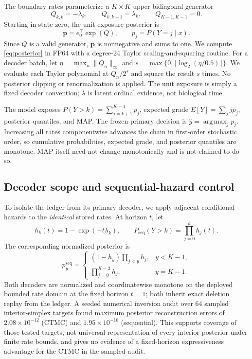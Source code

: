 \documentclass[10pt,twocolumn,letterpaper]{article}
\DeclareMathOperator*{\argmax}{arg\,max}
\begin{document}
The boundary rates parameterize a $K\times K$ upper-bidiagonal generator
\begin{equation}
Q_{k,k}=-\lambda_k,\qquad Q_{k,k+1}=\lambda_k,
\qquad Q_{K-1,K-1}=0.
\label{eq:generator}
\end{equation}
Starting in state zero, the unit-exposure posterior is
\begin{equation}
\mathbf p=e_0^\top\exp(Q),
\qquad p_j=P(Y=j\mid x).
\label{eq:posterior}
\end{equation}
Since $Q$ is a valid generator, $\mathbf p$ is nonnegative and sums to one.
We compute \cref{eq:posterior} in FP64 with a degree-24 Taylor
scaling-and-squaring routine.  For a decoder batch, let
$\eta=\max_n\lVert Q_n\rVert_\infty$ and
$s=\max\{0,\lceil\log_2(\eta/0.5)\rceil\}$.  We evaluate each Taylor
polynomial at $Q_n/2^s$ and square the result $s$ times.  No posterior clipping
or renormalization is applied.
The unit exposure is simply a fixed decoder convention; $\lambda$ is latent
ordinal evidence, not biological time.

The model exposes $P(Y>k)=\sum_{j=k+1}^{K-1}p_j$, expected grade
$E[Y]=\sum_jjp_j$, posterior quantiles, and MAP.  The frozen primary decision
is $\hat y=\argmax_jp_j$.  Increasing all rates componentwise advances the
chain in first-order stochastic order, so cumulative probabilities, expected
grade, and posterior quantiles are monotone.  MAP itself need not change
monotonically and is not claimed to do so.

\subsection{Decoder scope and sequential-hazard control}
\label{sec:decoder-scope}

To isolate the ledger from its primary decoder, we apply adjacent conditional
hazards to the \emph{identical} stored rates.  At horizon $t$, let
\begin{equation}
h_k(t)=1-\exp(-t\lambda_k),\qquad
P_{\mathrm{seq}}(Y>k)=\prod_{j=0}^{k}h_j(t).
\label{eq:sequential-tails}
\end{equation}
The corresponding normalized posterior is
\begin{equation}
p^{\mathrm{seq}}_y=
\begin{cases}
(1-h_y)\prod_{j<y}h_j,&y<K-1,\\
\prod_{j=0}^{K-2}h_j,&y=K-1.
\end{cases}
\label{eq:sequential-posterior}
\end{equation}
Both decoders are normalized and coordinatewise monotone on the deployed
bounded rate domain at the fixed horizon $t=1$; both inherit exact deletion
replay from the ledger.  A seeded numerical inversion audit over 64 sampled
interior-simplex targets found maximum posterior reconstruction errors of
$2.08\times10^{-12}$ (CTMC) and $1.95\times10^{-16}$ (sequential).  This
supports coverage of those tested targets, not universal representation of
every interior posterior under finite rate bounds, and gives no evidence of a
fixed-horizon expressiveness advantage for the CTMC in the sampled audit.
\end{document}
